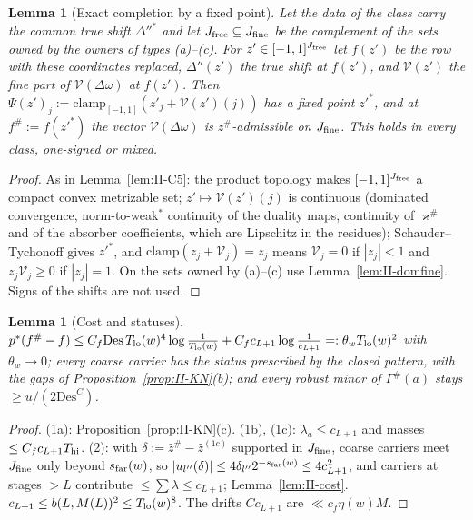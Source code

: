\documentclass[10pt]{amsart}
\newtheorem{lemma}[theorem]{Lemma}
\theoremstyle{definition}
\theoremstyle{remark}
\newcommand{\zh}{\hat z}
\begin{document}
\begin{lemma}[Exact completion by a fixed point]\label{lem:II-schauder}
Let the data of the class carry the common true shift $\Delta''^*$ and let $J_{\rm
free}\subseteq J_{\rm fine}$ be the complement of the sets owned by the owners of
types \textup{(a)}--\textup{(c)}.  For $z'\in[-1,1]^{J_{\rm free}}$ let $f(z')$ be the
row with these coordinates replaced, $\Delta''(z')$ the true shift at $f(z')$, and
$\mathcal V(z')$ the fine part of $\mathcal V(\Delta\omega)$ at $f(z')$.  Then $\Psi(z')_j:=\mathrm{clamp}_{
[-1,1]}(z'_j+\mathcal V(z')(j))$ has a fixed point $z'^*$, and at $f^\#:=f(z'^*)$ the
vector $\mathcal V(\Delta\omega)$ is $z^\#$-admissible on $J_{\rm fine}$.  This holds in every
class, one-signed or mixed.
\end{lemma}

\begin{proof}
As in Lemma~\ref{lem:II-C5}: the product topology makes $[-1,1]^{J_{\rm free}}$ a compact
convex metrizable set; $z'\mapsto\mathcal V(z')(j)$ is continuous (dominated convergence,
norm-to-weak$^*$ continuity of the duality maps, continuity of $\varkappa^\#$ and of the
absorber coefficients, which are Lipschitz in the residues); Schauder--Tychonoff
gives $z'^*$, and $\mathrm{clamp}(z_j+\mathcal V_j)=z_j$ means $\mathcal V_j=0$ if $|z_j|<1$ and
$z_j\mathcal V_j\ge0$ if $|z_j|=1$.  On the sets owned by (a)--(c) use
Lemma~\ref{lem:II-domfine}.  Signs of the shifts are not used.
\end{proof}

\begin{lemma}[Cost and statuses]\label{lem:II-coststat}
$p^*(f^\#-f)\le C_f\mathrm{Des}\,T_{\rm lo}(w)^4\log\frac1{T_{\rm lo}(w)}+C_fc_{L+1}\log\frac1{c_{L+1}}
=:\theta_wT_{\rm lo}(w)^2$ with $\theta_w\to0$; every coarse carrier has the status
prescribed by the closed pattern, with the gaps of
Proposition~\textup{\ref{prop:II-KN}(b)}; and every robust minor of $\Gamma^\#(a)$
stays $\ge u/(2\mathrm{Des}^C)$.
\end{lemma}

\begin{proof}
(1a): Proposition~\ref{prop:II-KN}(c).  (1b), (1c): $\lambda_a\le c_{L+1}$ and masses
$\le C_fc_{L+1}T_{\rm hi}$.  (2): with $\delta:=\zh^\#-\zh^{(1c)}$ supported in $J_{\rm fine}$,
coarse carriers meet $J_{\rm fine}$ only beyond $s_{\rm far}(w)$, so $|u_{l''}(\delta)|\le
4\delta_{l''}2^{-s_{\rm far}(w)}\le4c_{L+1}^2$, and carriers at stages $>L$ contribute $\le
\sum\lambda\le c_{L+1}$; Lemma~\ref{lem:II-cost}.  $c_{L+1}\le b(L,M(L))^2\le T_{\rm lo}(w)^8$.
The drifts $Cc_{L+1}$ are $\ll c_f\eta(w)M$.
\end{proof}
\end{document}
